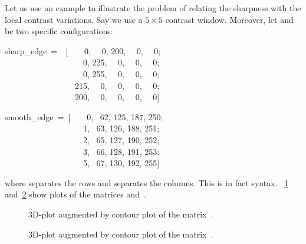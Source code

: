 Let us use an example to illustrate the problem of relating the sharpness with the local
contrast variations.  Say we use a $5 \times 5$ contrast window.  Moreover, let
 and  be two specific configurations:

\begin{literal}
  sharp\_edge~=~~[~~~~0,  ~~0,  200,  ~~0,  ~~0; \\
    ~~~~~~~~~~~~~~~~~~~0,  225,  ~~0,  ~~0,  ~~0; \\
    ~~~~~~~~~~~~~~~~~~~0,  255,  ~~0,  ~~0,  ~~0; \\
    ~~~~~~~~~~~~~~~~~215,  ~~0,  ~~0,  ~~0,  ~~0; \\
    ~~~~~~~~~~~~~~~~~200,  ~~0,  ~~0,  ~~0,  ~~0]
\end{literal}

\begin{literal}
  smooth\_edge~=~[~~~~0,  ~62,  125,  187,  250; \\
    ~~~~~~~~~~~~~~~~~~~1,  ~63,  126,  188,  251; \\
    ~~~~~~~~~~~~~~~~~~~2,  ~65,  127,  190,  252; \\
    ~~~~~~~~~~~~~~~~~~~3,  ~66,  128,  191,  253; \\
    ~~~~~~~~~~~~~~~~~~~5,  ~67,  130,  192,  255]
\end{literal}

\noindent where \sample{;} separates the rows and \sample{,} separates the columns.  This is in
fact  syntax.  \figureName~\ref{fig:sharp-edge}
and~\ref{fig:smooth-edge} show plots of the matrices  and~.


\begin{figure}[htbp]
  \begin{maxipage}
    \centering
  \end{maxipage}

  \caption[Sharp edge]{\label{fig:sharp-edge}%
    3D-plot augmented by contour plot of the matrix~.}
\end{figure}


\begin{figure}[htbp]
  \begin{maxipage}
    \centering
  \end{maxipage}

  \caption[Smooth edge]{\label{fig:smooth-edge}%
    3D-plot augmented by contour plot of the matrix~.}
\end{figure}



